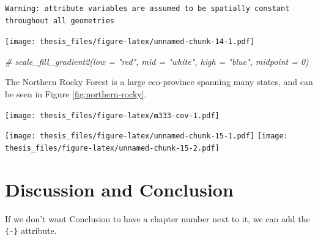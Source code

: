 \documentclass[12pt,twoside]{reedthesis}
\newenvironment{Shaded}{\begin{snugshade}}{\end{snugshade}}
\newcommand{\CommentTok}[1]{\textcolor[rgb]{0.56,0.35,0.01}{\textit{#1}}}
\newcommand{\DataTypeTok}[1]{\textcolor[rgb]{0.13,0.29,0.53}{#1}}
\newcommand{\KeywordTok}[1]{\textcolor[rgb]{0.13,0.29,0.53}{\textbf{#1}}}
\newcommand{\NormalTok}[1]{#1}
\newcommand{\OperatorTok}[1]{\textcolor[rgb]{0.81,0.36,0.00}{\textbf{#1}}}
\newcommand{\StringTok}[1]{\textcolor[rgb]{0.31,0.60,0.02}{#1}}
\begin{document}
\begin{verbatim}
Warning: attribute variables are assumed to be spatially constant
throughout all geometries
\end{verbatim}
\begin{Shaded}
\end{Shaded}
\texttt{[image: thesis\_files/figure-latex/unnamed-chunk-14-1.pdf]}
\begin{Shaded}
\begin{Highlighting}[]
  \CommentTok{# scale_fill_gradient2(low = "red", mid = "white", high = "blue", midpoint = 0)}
\end{Highlighting}
\end{Shaded}
The Northern Rocky Forest is a large eco-province spanning many states, and can be seen in Figure \ref{fig:northern-rocky}.

\texttt{[image: thesis\_files/figure-latex/m333-cov-1.pdf]}

\texttt{[image: thesis\_files/figure-latex/unnamed-chunk-15-1.pdf]} \texttt{[image: thesis\_files/figure-latex/unnamed-chunk-15-2.pdf]}

\hypertarget{discussion-and-conclusion}{%
\chapter{Discussion and Conclusion}\label{discussion-and-conclusion}}

If we don't want Conclusion to have a chapter number next to it, we can add the \texttt{\{-\}} attribute.
\end{document}
